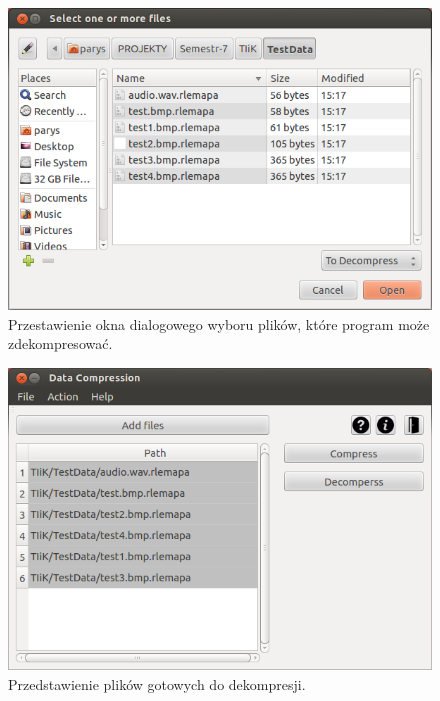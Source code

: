 \documentclass[12pt,a4paper,notitlepage]{report}
\begin{document}
\begin{figure}[H]
	\centering
	\includegraphics[scale=.7]{take2}
	\caption{Przestawienie okna dialogowego wyboru plików, które program może zdekompresować.}
\end{figure}
\begin{figure}[H]
	\centering
	\includegraphics[scale=.7]{decom}
	\caption{Przedstawienie plików gotowych do dekompresji.}
\end{figure}
\end{document}
